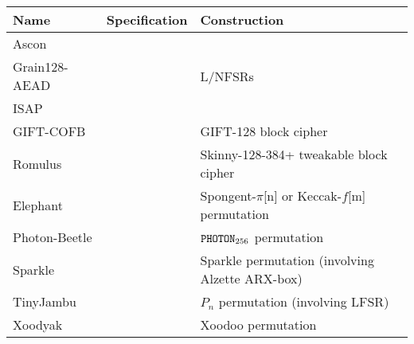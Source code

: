 \documentclass{beamer}
\begin{document}

\begin{frame}
\titlepage
\end{frame}

\begin{frame}

\begin{center}
\begin{scriptsize}
\begin{tabular}{|lc|l|}
\hline
Name          & Specification           & Construction                                                                     \\
\hline
Ascon         & \cite{NIST:LW:ascon}    &                                                                                  \\
Grain128-AEAD & \cite{NIST:LW:grain}    & L/NFSRs                                                                          \\
ISAP          & \cite{NIST:LW:isap}     &                                                                                  \\
\hline
GIFT-COFB     & \cite{NIST:LW:gift}     & GIFT-128                  block cipher                                           \\
Romulus       & \cite{NIST:LW:romulus}  & Skinny-128-384+ tweakable block cipher                                           \\
\hline
Elephant      & \cite{NIST:LW:elephant} & Spongent-$\pi$[n] or Keccak-$f$[m] permutation                                   \\
Photon-Beetle & \cite{NIST:LW:photon}   & ${\tt PHOTON}_{256}$               permutation                                   \\
Sparkle       & \cite{NIST:LW:sparkle}  & {\sc Sparkle}                      permutation (involving {\sf Alzette} ARX-box) \\
TinyJambu     & \cite{NIST:LW:jambu}    & $P_n$                              permutation (involving LFSR)                  \\
Xoodyak       & \cite{NIST:LW:xoodyak}  & {\sc Xoodoo}                       permutation                                   \\
\hline
\end{tabular}
\end{scriptsize}
\end{center}

\end{frame}

\end{document}
